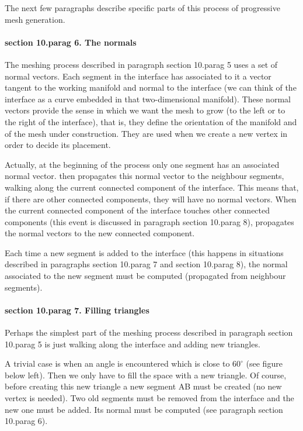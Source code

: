 The next few paragraphs describe specific parts of this process of progressive mesh generation.


\paragraph{\numb section 10.\numb parag 6. The normals}

The meshing process described in paragraph \numb section 10.\numb parag 5 uses a set of
normal vectors.
Each segment in the interface has associated to it
a vector tangent to the working manifold and normal to the interface (we can
think of the interface as a curve embedded in that two-dimensional manifold).
These normal vectors provide the sense in which we want the mesh to grow (to the left or to
the right of the interface), that is, they define the orientation of the manifold and of
the mesh under construction.
They are used when we create a new vertex in order to decide its placement.

Actually, at the beginning of the process only one segment has an associated normal vector.
{\ManiFEM} then propagates this normal vector to the neighbour segments, walking along
the current connected component of the interface.
This means that, if there are other connected components, they will have no normal vectors.
When the current connected component of the interface touches other connected components
(this event is discussed in paragraph \numb section 10.\numb parag 8), {\maniFEM}
propagates the normal vectors to the new connected component.

Each time a new segment is added to the interface (this happens in situations described in
paragraphs \numb section 10.\numb parag 7 and \numb section 10.\numb parag 8),
the normal associated to the new segment must be computed (propagated from neighbour
segments).
\vfil\eject


\paragraph{\numb section 10.\numb parag 7. Filling triangles}

Perhaps the simplest part of the meshing process described in paragraph
\numb section 10.\numb parag 5 is just walking along the interface and adding new triangles.

A trivial case is when an angle is encountered which is close to $ 60^\circ $
(see figure below left).
Then we only have to fill the space with a new triangle.
Of course, before creating this new triangle a new segment {\codett AB} must be created
(no new vertex is needed).
Two old segments must be removed from the interface and the new one must be added.
Its normal must be computed (see paragraph \numb section 10.\numb parag 6).

